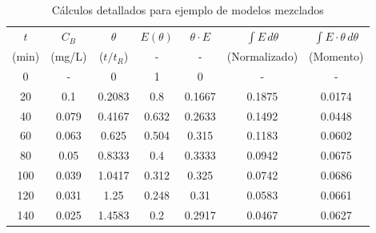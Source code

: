 \begin{table}[htbp]
    \centering
    \small
    \caption{Cálculos detallados para ejemplo de modelos mezclados}
    \label{tab:excel_escalon}
    \begin{tabular}{ccccccc}
        \toprule
        \textbf{$t$}                        & \textbf{$C_B$} & \textbf{$\theta$} & \textbf{$E(\theta)$} & \textbf{$\theta\cdot E$} & \textbf{$\int E \, d\theta$} & \textbf{$\int E\cdot\theta \, d\theta$} \\
        (min)                               & (mg/L)         & ($t/t_R$)         & -                    & -                        & (Normalizado)                & (Momento)                               \\ \midrule
        0                                   & -              & 0                 & 1                    & 0                        & -                            & -                                       \\
        20                                  & 0.1            & 0.2083            & 0.8                  & 0.1667                   & 0.1875                       & 0.0174                                  \\
        40                                  & 0.079          & 0.4167            & 0.632                & 0.2633                   & 0.1492                       & 0.0448                                  \\
        60                                  & 0.063          & 0.625             & 0.504                & 0.315                    & 0.1183                       & 0.0602                                  \\
        80                                  & 0.05           & 0.8333            & 0.4                  & 0.3333                   & 0.0942                       & 0.0675                                  \\
        100                                 & 0.039          & 1.0417            & 0.312                & 0.325                    & 0.0742                       & 0.0686                                  \\
        \rowcolor{blue!20} 120              & 0.031          & 1.25              & 0.248                & 0.31                     & 0.0583                       & 0.0661                                  \\
        \rowcolor{red!20} 140               & 0.025          & 1.4583            & 0.2                  & 0.2917                   & 0.0467                       & 0.0627                                  \\

\end{tabular}
\end{table}

